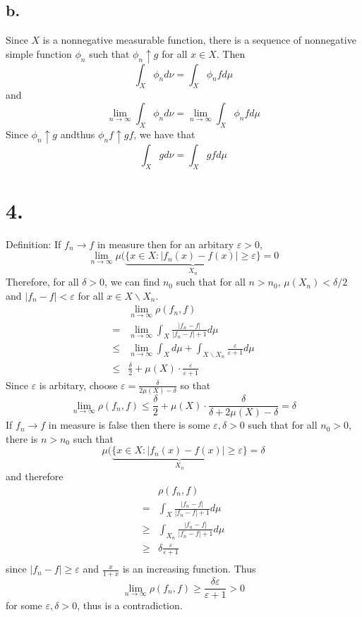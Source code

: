 \documentclass[11pt]{article}
\theoremstyle{mystyle}
\theoremstyle{definition}
\begin{document}
\subsection*{b.}
Since $X$ is a nonnegative measurable function, there is a sequence of nonnegative simple function $\phi_n$ such that $\phi_n \uparrow g$ for all $x \in X$. Then 
\[
  \int_X \phi_n d\nu = \int_X \phi_n f d\mu
\]
and 
\[
  \lim_{n \to \infty} \int_X \phi_n d\nu = \lim_{n \to \infty} \int_X \phi_n f d\mu
\]
Since $\phi_n \uparrow g$ andthus $\phi_n f \uparrow gf$, we have that 
\[
  \int_X g d\nu = \int_X gf d\mu
\]
\newpage
\section*{4.}
Definition: If $f_n \to f$ in measure then for an arbitary $\varepsilon > 0$,  
\[
  \lim_{n \to \infty} \mu(\underbrace{\{x \in X: |f_n(x) - f(x)| \ge \varepsilon\}}_{X_n} = 0
\]
Therefore, for all $\delta > 0$, we can find $n_0$ such that for all $n>n_0$, $\mu(X_n) < \delta/2$ and $|f_n-f| < \varepsilon$ for all $x \in X \backslash X_n$.  
\begin{align*} 
  &\lim_{n \to \infty} \rho(f_n, f) \\ 
  =& \lim_{n \to \infty} \int_X \displaystyle\frac{|f_n-f|}{|f_n - f| + 1} d\mu \\
  \le& \lim_{n \to \infty} \int_X d\mu + \int_{X\backslash X_n} \displaystyle\frac{\varepsilon}{\varepsilon + 1} d\mu \\
  \le& \displaystyle\frac{\delta}{2} + \mu(X) \cdot \displaystyle\frac{\varepsilon}{\varepsilon + 1}  
\end{align*}
Since $\varepsilon$ is arbitary, choose $\varepsilon = \displaystyle\frac{\delta}{2\mu(X)-\delta}$ so that 
\[
  \lim_{n \to \infty} \rho(f_n, f) \le \displaystyle\frac{\delta}{2} + \mu(X) \cdot \displaystyle\frac{\delta}{\delta + 2\mu(X) - \delta} = \delta
\]
If $f_n \to f$ in measure is false then there is some $\varepsilon, \delta > 0$ such that for all $n_0 > 0$, there is $n> n_0$ such that 
\[ 
  \mu(\underbrace{\{x \in X: |f_n(x) - f(x)| \ge \varepsilon\}}_{X_n} = \delta
\]
and therefore
\begin{align*}
  &\rho(f_n, f) \\
  =& \int_X \displaystyle\frac{|f_n-f|}{|f_n - f| + 1} d\mu \\
  \ge& \int_{X_n} \displaystyle\frac{|f_n-f|}{|f_n-f|+ 1} d\mu \\
  \ge & \delta \displaystyle\frac{\varepsilon}{\varepsilon + 1} \\
\end{align*} 
since $|f_n - f| \ge \varepsilon$ and $\displaystyle\frac{x}{1+x}$ is an increasing function. Thus 
\[
  \lim_{n \to \infty} \rho(f_n, f) \ge \displaystyle\frac{\delta \varepsilon}{\varepsilon+1} > 0
\]
for some $\varepsilon, \delta > 0$, thus is a contradiction. 
\newpage
\end{document}
